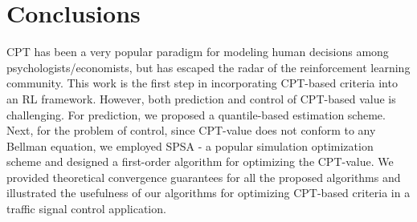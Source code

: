 \documentclass[twocolumn]{IEEEtran}
\begin{document}




\section{Conclusions}
\label{sec:conclusions}
CPT has been a very popular paradigm for modeling human decisions among psychologists/economists, but has escaped the radar of the reinforcement learning community. This work is the first step in incorporating CPT-based criteria into an RL framework. However, both prediction and control of CPT-based value is challenging. 
For prediction, we proposed a quantile-based estimation scheme. Next, for the problem of control, since CPT-value does not conform to any Bellman equation, we employed SPSA - a popular simulation optimization scheme and designed a first-order algorithm for optimizing the CPT-value. 
We provided theoretical convergence guarantees for all the proposed algorithms and illustrated the usefulness of our algorithms for optimizing CPT-based criteria in a traffic signal control application.



%





%
\end{document}
